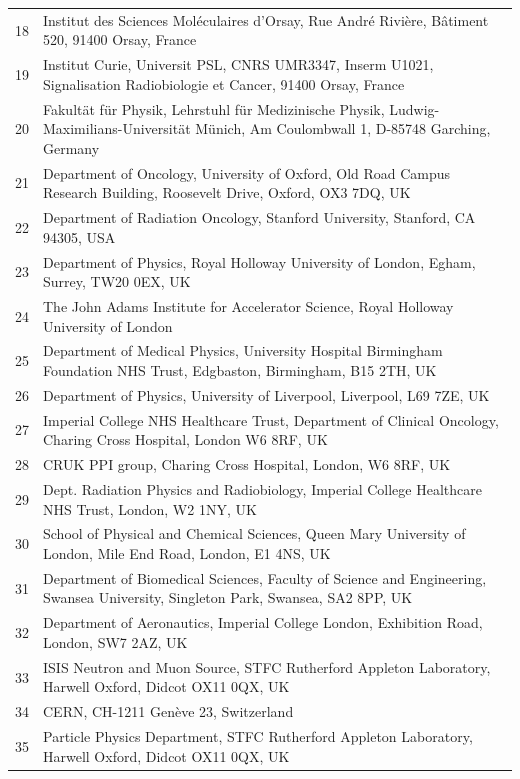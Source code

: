 {\begin{tabular}{ c p{15cm} }
     18 & Institut des Sciences Moléculaires d'Orsay, Rue André Rivière, Bâtiment 520, 91400 Orsay, France\\
     19 & Institut Curie, Universit PSL, CNRS UMR3347, Inserm U1021, Signalisation Radiobiologie et Cancer, 91400 Orsay, France\\
     20 & Fakult\"at f\"ur Physik, Lehrstuhl f\"ur Medizinische Physik, Ludwig-Maximilians-Universit\"at M\"unich, Am Coulombwall 1, D-85748 Garching, Germany\\
     21 & Department of Oncology, University of Oxford, Old Road Campus Research Building, Roosevelt Drive, Oxford, OX3 7DQ, UK\\
     22 & Department of Radiation Oncology, Stanford University, Stanford, CA 94305, USA\\
     23 & Department of Physics, Royal Holloway University of London, Egham, Surrey, TW20 0EX, UK\\
     24 & The John Adams Institute for Accelerator Science, Royal Holloway University of London\\
     25 & Department of Medical Physics, University Hospital Birmingham Foundation NHS Trust, Edgbaston, Birmingham, B15 2TH, UK\\
     26 & Department of Physics, University of Liverpool, Liverpool, L69 7ZE, UK\\
     27 & Imperial College NHS Healthcare Trust, Department of Clinical Oncology, Charing Cross Hospital, London W6 8RF, UK\\
     28 & CRUK PPI group, Charing Cross Hospital, London, W6 8RF, UK\\
     29 & Dept. Radiation Physics and Radiobiology, Imperial College Healthcare NHS Trust, London, W2 1NY, UK\\
     30 & School of Physical and Chemical Sciences, Queen Mary University of London, Mile End Road, London, E1 4NS, UK\\
     31 & Department of Biomedical Sciences, Faculty of Science and Engineering, Swansea University, Singleton Park, Swansea, SA2 8PP, UK\\
     32 & Department of Aeronautics, Imperial College London, Exhibition Road, London, SW7 2AZ, UK\\
     33 & ISIS Neutron and Muon Source, STFC Rutherford Appleton Laboratory, Harwell Oxford, Didcot OX11 0QX, UK\\
     34 & CERN, CH-1211 Genève 23, Switzerland\\
     35 & Particle Physics Department, STFC Rutherford Appleton Laboratory, Harwell Oxford, Didcot OX11 0QX, UK\\

\end{tabular}}
